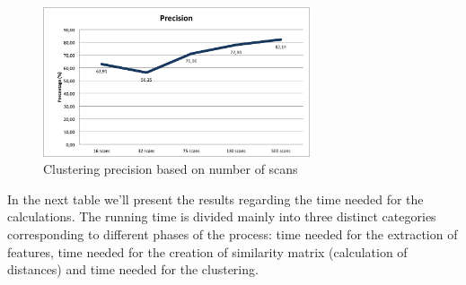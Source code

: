 \begin{figure}[!htbp]
\centering
\includegraphics[width=0.7\textwidth]{images/precisione.png}
\caption{Clustering precision based on number of scans}
\label{fig:precision}
\end{figure}

In the next table we'll present the results regarding the time needed for the calculations. The running time is divided mainly into three distinct categories corresponding to different phases of the process: time needed for the extraction of features, time needed for the creation of similarity matrix (calculation of distances) and time needed for the clustering.

